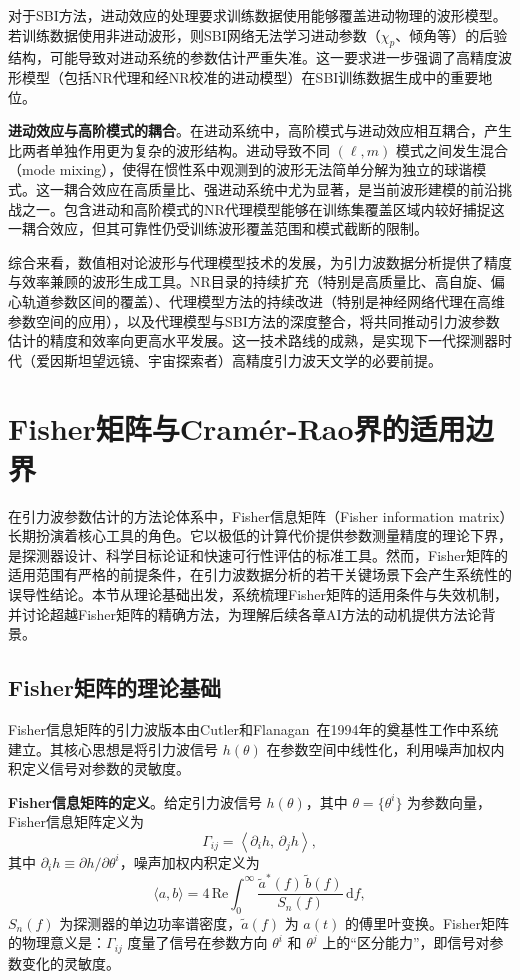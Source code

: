 对于SBI方法，进动效应的处理要求训练数据使用能够覆盖进动物理的波形模型。若训练数据使用非进动波形，则SBI网络无法学习进动参数（$\chi_p$、倾角等）的后验结构，可能导致对进动系统的参数估计严重失准。这一要求进一步强调了高精度波形模型（包括NR代理和经NR校准的进动模型）在SBI训练数据生成中的重要地位。

\textbf{进动效应与高阶模式的耦合}。在进动系统中，高阶模式与进动效应相互耦合，产生比两者单独作用更为复杂的波形结构。进动导致不同 $(\ell, m)$ 模式之间发生混合（mode mixing），使得在惯性系中观测到的波形无法简单分解为独立的球谐模式。这一耦合效应在高质量比、强进动系统中尤为显著，是当前波形建模的前沿挑战之一。包含进动和高阶模式的NR代理模型能够在训练集覆盖区域内较好捕捉这一耦合效应，但其可靠性仍受训练波形覆盖范围和模式截断的限制。

综合来看，数值相对论波形与代理模型技术的发展，为引力波数据分析提供了精度与效率兼顾的波形生成工具。NR目录的持续扩充（特别是高质量比、高自旋、偏心轨道参数区间的覆盖）、代理模型方法的持续改进（特别是神经网络代理在高维参数空间的应用），以及代理模型与SBI方法的深度整合，将共同推动引力波参数估计的精度和效率向更高水平发展。这一技术路线的成熟，是实现下一代探测器时代（爱因斯坦望远镜、宇宙探索者）高精度引力波天文学的必要前提。

\section{Fisher矩阵与Cramér-Rao界的适用边界}

在引力波参数估计的方法论体系中，Fisher信息矩阵（Fisher information matrix）长期扮演着核心工具的角色。它以极低的计算代价提供参数测量精度的理论下界，是探测器设计、科学目标论证和快速可行性评估的标准工具。然而，Fisher矩阵的适用范围有严格的前提条件，在引力波数据分析的若干关键场景下会产生系统性的误导性结论。本节从理论基础出发，系统梳理Fisher矩阵的适用条件与失效机制，并讨论超越Fisher矩阵的精确方法，为理解后续各章AI方法的动机提供方法论背景。

\subsection{Fisher矩阵的理论基础}

Fisher信息矩阵的引力波版本由Cutler和Flanagan~\cite{Cutler1994PE}在1994年的奠基性工作中系统建立。其核心思想是将引力波信号 $h(\theta)$ 在参数空间中线性化，利用噪声加权内积定义信号对参数的灵敏度。

\textbf{Fisher信息矩阵的定义}。给定引力波信号 $h(\theta)$，其中 $\theta = \{\theta^i\}$ 为参数向量，Fisher信息矩阵定义为
\begin{equation}
  \Gamma_{ij} = \left\langle \partial_i h,\, \partial_j h \right\rangle,
  \label{eq:fisher_def}
\end{equation}
其中 $\partial_i h \equiv \partial h / \partial\theta^i$，噪声加权内积定义为
\begin{equation}
  \langle a, b \rangle = 4\,\mathrm{Re}\int_0^\infty \frac{\tilde{a}^*(f)\,\tilde{b}(f)}{S_n(f)}\,\mathrm{d}f,
\end{equation}
$S_n(f)$ 为探测器的单边功率谱密度，$\tilde{a}(f)$ 为 $a(t)$ 的傅里叶变换。Fisher矩阵的物理意义是：$\Gamma_{ij}$ 度量了信号在参数方向 $\theta^i$ 和 $\theta^j$ 上的“区分能力”，即信号对参数变化的灵敏度。

